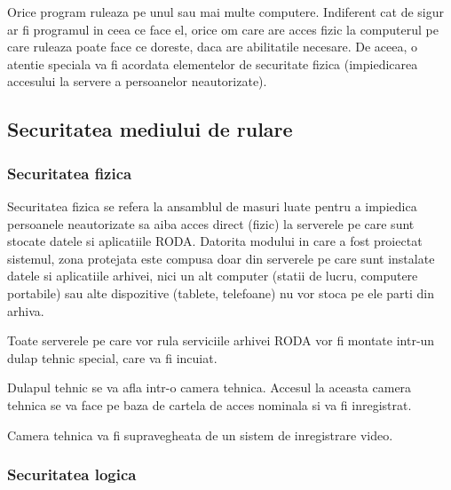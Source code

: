 \bigskip

{\sffamily\color{black}
Orice program ruleaza pe unul sau mai multe computere. Indiferent cat de sigur ar fi programul in ceea ce face el, orice
om care are acces fizic la computerul pe care ruleaza poate face ce doreste, daca are abilitatile necesare. De aceea, o
atentie speciala va fi acordata elementelor de securitate fizica (impiedicarea accesului la servere a persoanelor
neautorizate).}

\bigskip

\subsection{Securitatea mediului de rulare}
\label{securitatea_serverului}
\bigskip

\subsubsection{Securitatea fizica}

\bigskip

{\sffamily\color{black}
Securitatea fizica se refera la ansamblul de masuri luate pentru a impiedica persoanele neautorizate sa aiba acces
direct (fizic) la serverele pe care sunt stocate datele si aplicatiile RODA. Datorita modului in care a fost proiectat
sistemul, zona protejata este compusa doar din serverele pe care sunt instalate datele si aplicatiile arhivei, nici un
alt computer (statii de lucru, computere portabile) sau alte dispozitive (tablete, telefoane) nu vor stoca pe ele parti
din arhiva. }


\bigskip

{\sffamily\color{black}
Toate serverele pe care vor rula serviciile arhivei RODA vor fi montate intr-un dulap tehnic special, care va fi
incuiat. }


\bigskip

{\sffamily\color{black}
Dulapul tehnic se va afla intr-o camera tehnica. Accesul la aceasta camera tehnica se va face pe baza de cartela de
acces nominala si va fi inregistrat. }


\bigskip

{\sffamily\color{black}
Camera tehnica va fi supravegheata de un sistem de inregistrare video. }


\bigskip


\bigskip

\subsubsection{Securitatea logica}

